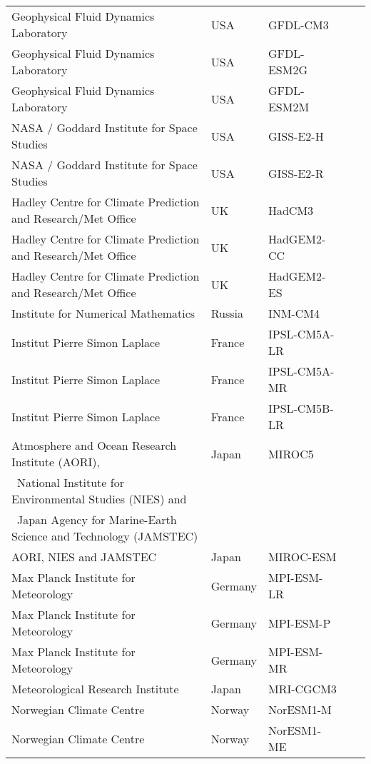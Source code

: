 \begin{center}
\begin{table}[ht]
\begin{tabular}{ l  l  l  l l}
Geophysical Fluid Dynamics Laboratory & USA & GFDL-CM3 \\
Geophysical Fluid Dynamics Laboratory & USA & GFDL-ESM2G \\
Geophysical Fluid Dynamics Laboratory & USA & GFDL-ESM2M \\
NASA / Goddard Institute for Space Studies & USA & GISS-E2-H \\
NASA / Goddard Institute for Space Studies & USA & GISS-E2-R \\
Hadley Centre for Climate Prediction and Research/Met Office & UK & HadCM3 \\
Hadley Centre for Climate Prediction and Research/Met Office & UK & HadGEM2-CC 
 \\
Hadley Centre for Climate Prediction and Research/Met Office & UK & HadGEM2-ES 
 \\
Institute for Numerical Mathematics & Russia & INM-CM4 \\
Institut Pierre Simon Laplace & France & IPSL-CM5A-LR \\
Institut Pierre Simon Laplace & France & IPSL-CM5A-MR \\
Institut Pierre Simon Laplace & France & IPSL-CM5B-LR \\
		Atmosphere and Ocean Research Institute (AORI),    & Japan & MIROC5 \\
		\	National Institute for Environmental Studies (NIES) and  &&& \\
		\	Japan Agency for Marine-Earth Science and Technology (JAMSTEC) && & \\
AORI, NIES and JAMSTEC		& Japan & MIROC-ESM \\
Max Planck Institute for Meteorology & Germany & MPI-ESM-LR \\
Max Planck Institute for Meteorology & Germany & MPI-ESM-P \\
Max Planck Institute for Meteorology & Germany & MPI-ESM-MR \\
Meteorological Research Institute & Japan & MRI-CGCM3 \\
Norwegian Climate Centre & Norway & NorESM1-M \\
Norwegian Climate Centre & Norway & NorESM1-ME \\
	\end{tabular}
	\end{table}
\end{center}



